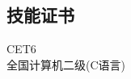 \documentclass[]{deedy-resume-openfont}
\begin{document}
\begin{minipage}[t]{0.25\textwidth}
\subsection{技能证书}
CET6 \\
全国计算机二级(C语言) \\
\sectionsep


%
%

\end{minipage} 
\hfill
\end{document}
